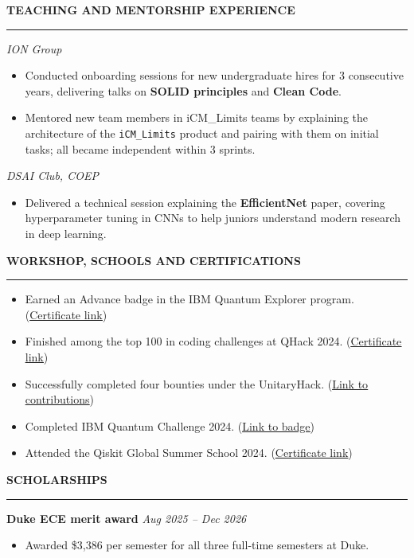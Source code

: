 \documentclass[a4paper,10pt]{article}
\let\oldhref\href
\renewcommand{\href}[2]{\oldhref{#1}{\uline{#2}}}
\newcommand{\cvHeaderOne}[1]{%
  \vspace*{1.5em}%
  {\noindent\large\textbf{\MakeUppercase{#1}}\par}%
  \noindent\rule{\linewidth}{0.4pt}%
  \vspace*{0.5em}%
}
\newcommand{\cvHeaderTwo}[2]{%
  \vspace{0.8em}%
  \noindent\textbf{\normalsize #1} \hfill \textit{#2}\par%
}
\newcommand{\cvHeaderThree}[1]{%
  \noindent\textit{#1}%
}
\newenvironment{cvItemList}{%
  \begin{itemize}%
    \setlength{\itemsep}{0.1em}%
    \setlength{\topsep}{0em}%
    \setlength{\partopsep}{0em}%
    \setlength{\parsep}{0em}%
    \setlength{\parskip}{0em}%
}{%
  \end{itemize}%
}
\begin{document}
\cvHeaderOne{Teaching and Mentorship Experience}

\cvHeaderThree{ION Group}
\begin{cvItemList}
  \item Conducted onboarding sessions for new undergraduate hires for 3 consecutive years, delivering talks on \textbf{SOLID principles} and \textbf{Clean Code}.
  \item Mentored new team members in iCM\_Limits teams by explaining the architecture of the \texttt{iCM\_Limits} product and pairing with them on initial tasks; all became independent within 3 sprints.
\end{cvItemList}

\cvHeaderThree{DSAI Club, COEP}
\begin{cvItemList}
  \item Delivered a technical session explaining the \textbf{EfficientNet} paper, covering hyperparameter tuning in CNNs to help juniors understand modern research in deep learning.
\end{cvItemList}

\cvHeaderOne{Workshop, Schools and Certifications}
\begin{cvItemList}
\item Earned an Advance badge in the IBM Quantum Explorer program. (\href{https://www.credly.com/badges/28fb91b1-077d-45e3-8f1a-77a383ee392c/linked_in_profile}{Certificate link})  
\item Finished among the top 100 in coding challenges at QHack 2024. (\href{https://pennylane.ai/profile/tarun07?certificate=qhack-2024-coding-challenges-top-100}{Certificate link})  
\item Successfully completed four bounties under the UnitaryHack. (\href{https://unitaryhack.dev/hackers/tarun-kumar07/}{Link to contributions})  
\item Completed IBM Quantum Challenge 2024. (\href{https://www.credly.com/badges/5ab13c32-2ecf-42ab-ba84-e308deb7a511/linked_in_profile}{Link to badge})  
\item Attended the Qiskit Global Summer School 2024. (\href{https://www.credly.com/badges/6346a498-05fc-482f-9c56-25114b9bad2c/linked_in_profile}{Certificate link})
\end{cvItemList}

\cvHeaderOne{Scholarships}
\cvHeaderTwo{Duke ECE merit award}{Aug 2025 -- Dec 2026}
\begin{cvItemList}
  \item Awarded \$3{,}386 per semester for all three full-time semesters at Duke.
\end{cvItemList}
\end{document}
